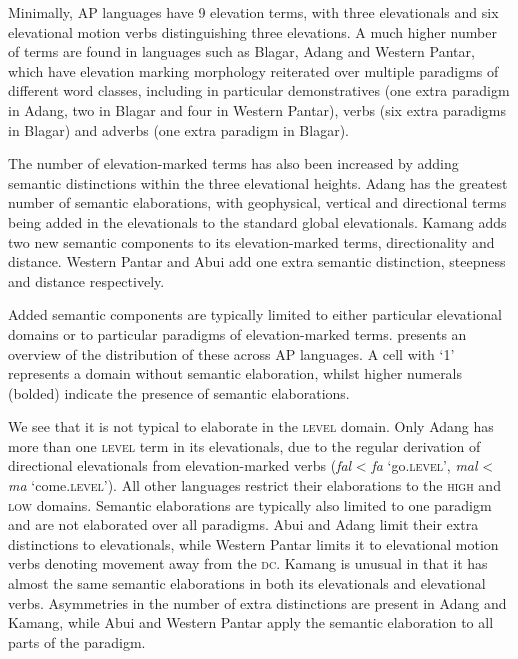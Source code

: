 Minimally, AP languages have 9 elevation terms, with three elevationals and six elevational motion verbs distinguishing three elevations. A much higher number of terms are found in languages such as Blagar, Adang and Western Pantar, which have elevation marking morphology reiterated over multiple paradigms of different word classes, including in particular demonstratives (one extra paradigm in Adang, two in Blagar and four in Western Pantar), verbs (six extra paradigms in Blagar) and adverbs (one extra paradigm in Blagar).

The number of elevation-marked terms has also been increased by adding semantic distinctions within the three elevational heights. Adang has the greatest number of semantic elaborations, with geophysical, vertical and directional terms being added in the elevationals to the standard global elevationals. Kamang adds two new semantic components to its elevation-marked terms, directionality and distance. Western Pantar and Abui add one extra semantic distinction, steepness and distance respectively. 

Added semantic components are typically limited to either particular elevational domains or to particular paradigms of elevation-marked terms.  presents an overview of the distribution of these across AP languages. A cell with `1' represents a domain without semantic elaboration, whilst higher numerals (bolded) indicate the presence of semantic elaborations. 

We see that it is not typical to elaborate in the \textsc{level} domain. Only Adang has more than one \textsc{level} term in its elevationals, due to the regular derivation of directional elevationals from elevation-marked verbs (\textit{fal}\textit{{\textepsilon}} {\textless} \textit{fa} `go\textsc{.level',} \textit{mal}\textit{{\textepsilon}} {\textless} \textit{ma}  `come\textsc{.level'}). All other languages restrict their elaborations to the \textsc{high} and \textsc{low} domains. Semantic elaborations are typically also limited to one paradigm and are not elaborated over all paradigms. Abui and Adang limit their extra distinctions to elevationals, while Western Pantar limits it to elevational motion verbs denoting movement away from the \textsc{dc}. Kamang is unusual in that it has almost the same semantic elaborations in both its elevationals and elevational verbs. Asymmetries in the number of extra distinctions are present in Adang and Kamang, while Abui and Western Pantar apply the semantic elaboration to all parts of the paradigm.
 

